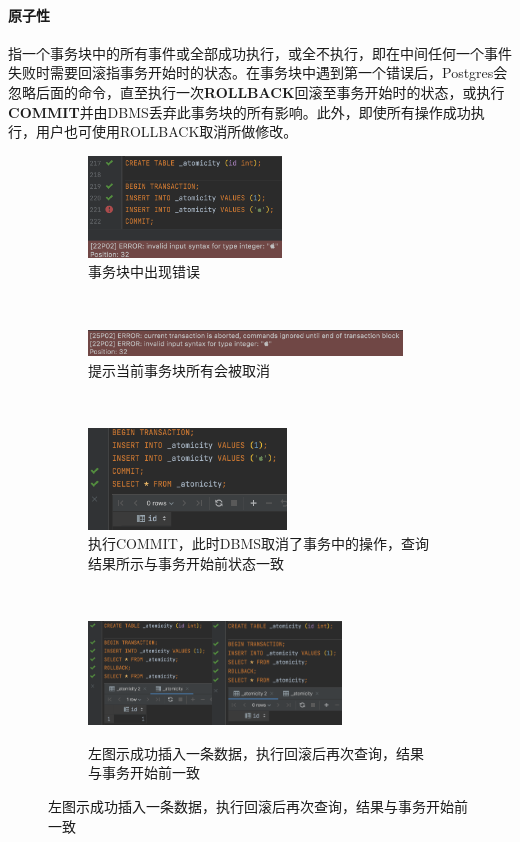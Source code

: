 \paragraph{原子性} 指一个事务块中的所有事件或全部成功执行，或全不执行，即在中间任何一个事件失败时需要回滚指事务开始时的状态。在事务块中遇到第一个错误后，Postgres会忽略后面的命令，直至执行一次\textbf{ROLLBACK}回滚至事务开始时的状态，或执行\textbf{COMMIT}并由DBMS丢弃此事务块的所有影响。此外，即使所有操作成功执行，用户也可使用ROLLBACK取消所做修改。
\begin{figure}[!h]
	\centering
	\begin{subfigure}[b]{0.3\textwidth}
		\centerline{\includegraphics[height=2.7cm]{./sp/trs1}}
		\caption{事务块中出现错误}
	\end{subfigure}
	\\
	\begin{subfigure}[b]{0.3\textwidth}
		\centerline{\includegraphics[height=0.7cm]{./sp/trs2}}
		\caption{提示当前事务块所有会被取消}
	\end{subfigure}
	\\
	\begin{subfigure}[b]{0.9\textwidth}
		\centerline{\includegraphics[height=2.7cm]{./sp/trs3}}
		\caption{执行COMMIT，此时DBMS取消了事务中的操作，查询结果所示与事务开始前状态一致}
	\end{subfigure}
	\\
	\begin{subfigure}[b]{0.9\textwidth}
		\centerline{\includegraphics[height=2.75cm]{./sp/trs4}\qquad\includegraphics[height=2.75cm]{./sp/trs5}}
		\caption{左图示成功插入一条数据，执行回滚后再次查询，结果与事务开始前一致}
	\end{subfigure}
\end{figure}

